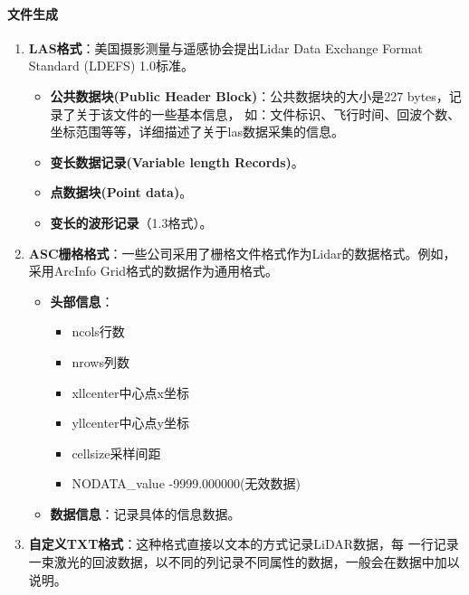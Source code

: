 \paragraph{文件生成}
\begin{enumerate}
	\item \textbf{LAS格式}：美国摄影测量与遥感协会提出Lidar Data Exchange Format Standard (LDEFS) 1.0标准。
		\begin{itemize}
			\item \textbf{公共数据块(Public Header Block)}：公共数据块的大小是227 bytes，记录了关于该文件的一些基本信息，
				如：文件标识、飞行时间、回波个数、坐标范围等等，详细描述了关于las数据采集的信息。
			\item \textbf{变长数据记录(Variable length Records)}。
			\item \textbf{点数据块(Point data)}。
			\item \textbf{变长的波形记录}（1.3格式）。
		\end{itemize}
	\item \textbf{ASC栅格格式}：一些公司采用了栅格文件格式作为Lidar的数据格式。例如，采用ArcInfo Grid格式的数据作为通用格式。
		\begin{itemize}
			\item \textbf{头部信息}：
				\begin{itemize}
					\item ncols行数
					\item nrows列数
					\item xllcenter中心点x坐标
					\item yllcenter中心点y坐标
					\item cellsize采样间距
					\item NODATA\_value -9999.000000(无效数据)
				\end{itemize}
			\item \textbf{数据信息}：记录具体的信息数据。
		\end{itemize}
	\item \textbf{自定义TXT格式}：这种格式直接以文本的方式记录LiDAR数据，每 一行记录一束激光的回波数据，以不同的列记录不同属性的数据，一般会在数据中加以说明。
\end{enumerate}

